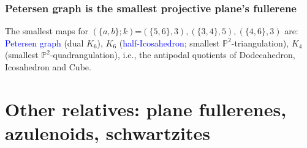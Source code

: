\documentclass{beamer}
\begin{document}
\begin{frame}\frametitle{Petersen graph is  the smallest  projective plane's
 fullerene} 


The smallest maps for $(\{a,b\};k)$=$(\{5,6\},3),(\{3,4\},5),(\{4,6\},3)$ are:
 \textcolor{blue}{Petersen  graph}   (dual $K_6$), $K_6$ (\textcolor{blue}{half-Icosahedron};  smallest $\mathbb{P}^2$-triangulation),
$K_4$ (smallest $\mathbb{P}^2$-quadrangulation),
i.e., the  antipodal quotients of Dodecahedron, Icosahedron and Cube.
 
  


\begin{center}  
\centering
{}\par
\end{center}


\end{frame}



\section[]{
Other relatives: 
plane fullerenes, azulenoids, schwartzites}
\end{document}

